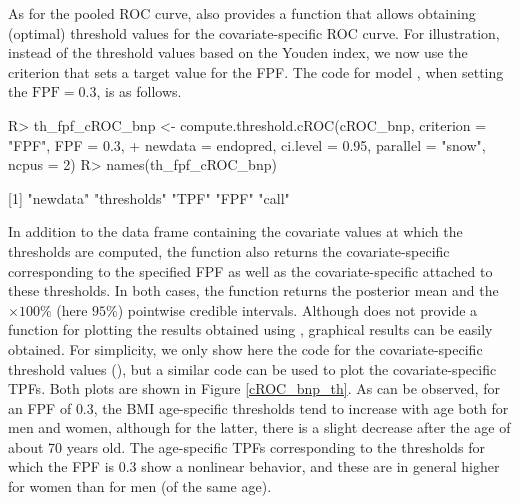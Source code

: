 As for the pooled ROC curve,  also provides a function that allows obtaining (optimal) threshold values for the covariate-specific ROC curve. For illustration, instead of the threshold values based on the Youden index, we now use the criterion that sets a target value for the FPF. The code for model , when setting the $\text{FPF} = 0.3$, is as follows. 
\begin{example}
R> th_fpf_cROC_bnp <- compute.threshold.cROC(cROC_bnp, criterion = "FPF", FPF = 0.3, 
+ newdata = endopred, ci.level = 0.95, parallel = "snow", ncpus = 2)
R> names(th_fpf_cROC_bnp)

[1] "newdata"    "thresholds" "TPF"    "FPF"    "call"
\end{example}
In addition to the data frame  containing the covariate values at which the thresholds are computed, the function  also returns the covariate-specific  corresponding to the specified FPF as well as the covariate-specific  attached to these thresholds. In both cases, the function returns the posterior mean and the $\times 100\%$ (here $95\%$) pointwise credible intervals. Although  does not provide a function for plotting the results obtained using , graphical results can be easily obtained. For simplicity, we only show here the code for the covariate-specific threshold values (), but a similar code can be used to plot the covariate-specific TPFs. Both plots are shown in Figure \ref{cROC_bnp_th}. As can be observed, for an FPF of $0.3$, the BMI age-specific thresholds tend to increase with age both for men and women, although for the latter, there is a slight decrease after the age of about 70 years old. The age-specific TPFs corresponding to the thresholds for which the FPF is $0.3$ show a nonlinear behavior, and these are in general higher for women than for men (of the same age).


